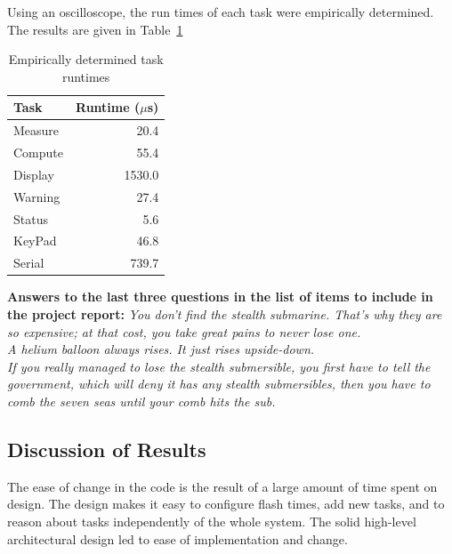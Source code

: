 \documentclass[12pt]{article} %
\begin{document}
    Using an oscilloscope, the run times of each task were empirically
    determined. The results are given in Table~\ref{tab:taskRuntimes}

    \begin{table}[h]
      \centering
      \begin{tabular}{|l|r|} 
	\hline
	Task & Runtime ($\mu$s) \\ \hline
	Measure & 20.4 \\ \hline
	Compute & 55.4 \\ \hline
	Display & 1530.0 \\ \hline
	Warning & 27.4 \\ \hline
	Status & 5.6 \\ \hline
  KeyPad & 46.8 \\ \hline
  Serial & 739.7 \\ \hline
      \end{tabular}
      \caption{Empirically determined task runtimes}
      \label{tab:taskRuntimes}
    \end{table}

    \textbf{Answers to the last three questions in the list of items to include
    in the project report:}
    \emph{You don't find the stealth submarine. That's why they are so expensive; at that cost, you take great pains to never lose one.\\  A helium balloon always rises. It just rises upside-down. \\ If you really managed to lose the stealth submersible, you first have to tell the government, which will deny it has any stealth submersibles, then you have to comb the seven seas until your comb hits the sub.}

    \subsection{Discussion of Results}
    The ease of change in the code is the result of a large amount of time spent on
    design. The design makes it easy to configure flash times, add new tasks, and
    to reason about tasks independently of the whole system. The solid high-level
    architectural design led to ease of implementation and change.
\end{document}
